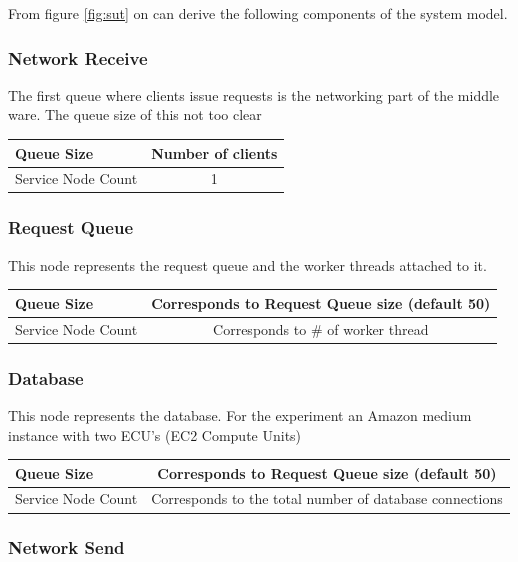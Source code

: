 \documentclass[a4paper]{article}
\begin{document}
From figure \ref{fig:sut} on can derive the following components of the system model.

\subsubsection{Network Receive}
The first queue where clients issue requests is the networking part of the middle ware. The queue size of this not too clear \\

\begin{tabular}{|l|c|}
\hline 
Queue Size & Number of clients \\ 
\hline 
Service Node Count & 1 \\ 
\hline 
\end{tabular} 

\subsubsection{Request Queue}
This node represents the request queue and the worker threads attached to it.\\

\begin{tabular}{|l|c|}
\hline 
Queue Size & Corresponds to Request Queue size (default 50)\\ 
\hline 
Service Node Count & Corresponds to \# of worker thread \\ 
\hline 
\end{tabular} 

\subsubsection{Database}
This node represents the database. For the experiment an Amazon medium instance with two ECU's (EC2 Compute Units)

\begin{tabular}{|l|c|}
\hline 
Queue Size & Corresponds to Request Queue size (default 50)\\ 
\hline 
Service Node Count & Corresponds to the total number of database connections \\ 
\hline 
\end{tabular} 


\subsubsection{Network Send}
\end{document}
